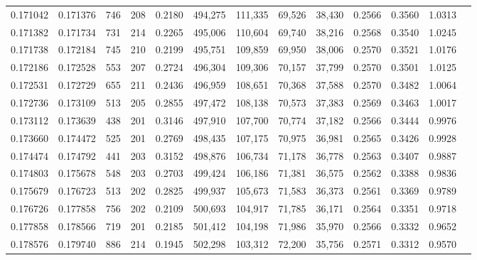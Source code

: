 \begin{tabular}{rrrrrrrrrrrrr}
0.171042 & 0.171376 &   746 & 208 &                                     0.2180 & 494,275 & 111,335 &  69,526 &  38,430 & 0.2566 & 0.3560 & 1.0313 \\
0.171382 & 0.171734 &   731 & 214 &                                     0.2265 & 495,006 & 110,604 &  69,740 &  38,216 & 0.2568 & 0.3540 & 1.0245 \\
0.171738 & 0.172184 &   745 & 210 &                                     0.2199 & 495,751 & 109,859 &  69,950 &  38,006 & 0.2570 & 0.3521 & 1.0176 \\
0.172186 & 0.172528 &   553 & 207 &                                     0.2724 & 496,304 & 109,306 &  70,157 &  37,799 & 0.2570 & 0.3501 & 1.0125 \\
0.172531 & 0.172729 &   655 & 211 &                                     0.2436 & 496,959 & 108,651 &  70,368 &  37,588 & 0.2570 & 0.3482 & 1.0064 \\
0.172736 & 0.173109 &   513 & 205 &                                     0.2855 & 497,472 & 108,138 &  70,573 &  37,383 & 0.2569 & 0.3463 & 1.0017 \\
0.173112 & 0.173639 &   438 & 201 &                                     0.3146 & 497,910 & 107,700 &  70,774 &  37,182 & 0.2566 & 0.3444 & 0.9976 \\
0.173660 & 0.174472 &   525 & 201 &                                     0.2769 & 498,435 & 107,175 &  70,975 &  36,981 & 0.2565 & 0.3426 & 0.9928 \\
0.174474 & 0.174792 &   441 & 203 &                                     0.3152 & 498,876 & 106,734 &  71,178 &  36,778 & 0.2563 & 0.3407 & 0.9887 \\
0.174803 & 0.175678 &   548 & 203 &                                     0.2703 & 499,424 & 106,186 &  71,381 &  36,575 & 0.2562 & 0.3388 & 0.9836 \\
0.175679 & 0.176723 &   513 & 202 &                                     0.2825 & 499,937 & 105,673 &  71,583 &  36,373 & 0.2561 & 0.3369 & 0.9789 \\
0.176726 & 0.177858 &   756 & 202 &                                     0.2109 & 500,693 & 104,917 &  71,785 &  36,171 & 0.2564 & 0.3351 & 0.9718 \\
0.177858 & 0.178566 &   719 & 201 &                                     0.2185 & 501,412 & 104,198 &  71,986 &  35,970 & 0.2566 & 0.3332 & 0.9652 \\
0.178576 & 0.179740 &   886 & 214 &                                     0.1945 & 502,298 & 103,312 &  72,200 &  35,756 & 0.2571 & 0.3312 & 0.9570 \\

\end{tabular}
